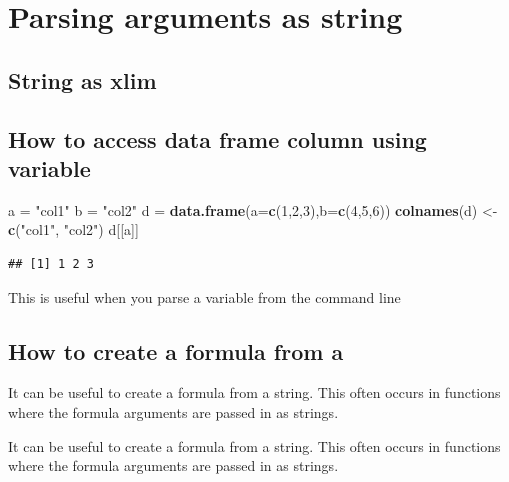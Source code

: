 \documentclass[]{book}
\makeatletter
\newenvironment{Shaded}{\begin{snugshade}}{\end{snugshade}}
\newcommand{\DataTypeTok}[1]{\textcolor[rgb]{0.13,0.29,0.53}{#1}}
\newcommand{\DecValTok}[1]{\textcolor[rgb]{0.00,0.00,0.81}{#1}}
\newcommand{\KeywordTok}[1]{\textcolor[rgb]{0.13,0.29,0.53}{\textbf{#1}}}
\newcommand{\NormalTok}[1]{#1}
\newcommand{\StringTok}[1]{\textcolor[rgb]{0.31,0.60,0.02}{#1}}
\newenvironment{kframe}{%
\medskip{}
\setlength{\fboxsep}{.8em}
 \def\at@end@of@kframe{}%
 \ifinner\ifhmode%
  \def\at@end@of@kframe{\end{minipage}}%
  \begin{minipage}{\columnwidth}%
 \fi\fi%
 \def\FrameCommand##1{\hskip\@totalleftmargin \hskip-\fboxsep
 \colorbox{shadecolor}{##1}\hskip-\fboxsep
     \hskip-\linewidth \hskip-\@totalleftmargin \hskip\columnwidth}%
 \MakeFramed {\advance\hsize-\width
   \@totalleftmargin\z@ \linewidth\hsize
   \@setminipage}}%
 {\par\unskip\endMakeFramed%
 \at@end@of@kframe}
\renewenvironment{Shaded}{\begin{kframe}}{\end{kframe}}
\makeatother
\begin{document}
\hypertarget{parsing-arguments-as-string}{%
\section{Parsing arguments as string}\label{parsing-arguments-as-string}}

\hypertarget{string-as-xlim}{%
\subsection{String as xlim}\label{string-as-xlim}}

\hypertarget{how-to-access-data-frame-column-using-variable}{%
\subsection{How to access data frame column using variable}\label{how-to-access-data-frame-column-using-variable}}

\begin{Shaded}
\begin{Highlighting}[]
\NormalTok{a =}\StringTok{ "col1"}
\NormalTok{b =}\StringTok{ "col2"}
\NormalTok{d =}\StringTok{ }\KeywordTok{data.frame}\NormalTok{(}\DataTypeTok{a=}\KeywordTok{c}\NormalTok{(}\DecValTok{1}\NormalTok{,}\DecValTok{2}\NormalTok{,}\DecValTok{3}\NormalTok{),}\DataTypeTok{b=}\KeywordTok{c}\NormalTok{(}\DecValTok{4}\NormalTok{,}\DecValTok{5}\NormalTok{,}\DecValTok{6}\NormalTok{))}
\KeywordTok{colnames}\NormalTok{(d) <-}\StringTok{ }\KeywordTok{c}\NormalTok{(}\StringTok{"col1"}\NormalTok{, }\StringTok{"col2"}\NormalTok{)}
\NormalTok{d[[a]]}
\end{Highlighting}
\end{Shaded}

\begin{verbatim}
## [1] 1 2 3
\end{verbatim}

This is useful when you parse a variable from the command line

\hypertarget{how-to-create-a-formula-from-a}{%
\subsection{How to create a formula from a}\label{how-to-create-a-formula-from-a}}

It can be useful to create a formula from a string. This often occurs in functions where the formula arguments are passed in as strings.

It can be useful to create a formula from a string. This often occurs in functions where the formula arguments are passed in as strings.
\end{document}
